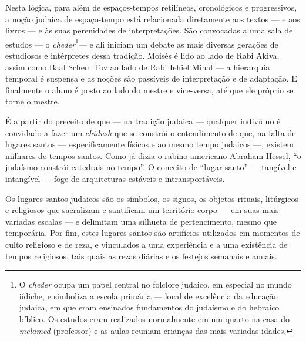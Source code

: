 Nesta lógica, para além de espaços-tempos retilíneos, cronológicos e
progressivos, a noção judaica de espaço-tempo está relacionada
diretamente aos textos --- e aos livros --- e às suas perenidades de
interpretações. São convocadas a uma sala de estudos --- o
\emph{cheder}\footnote{O \emph{cheder} ocupa um papel central no
  folclore judaico, em especial no mundo iídiche, e simboliza a
  escola primária --- local de excelência da educação judaica, em que
  eram ensinados fundamentos do judaísmo e do hebraico bíblico. Os
  estudos eram realizados normalmente em um quarto na casa do
  \emph{melamed} (professor) e as aulas reuniam crianças das mais
  variadas idades.}--- e ali iniciam um debate as mais diversas gerações
de estudiosos e intérpretes dessa tradição. Moisés é lido ao lado de
Rabi Akiva, assim como Baal Schem Tov ao lado de Rabi Iehiel Mihal --- a
hierarquia temporal é suspensa e as noções são passíveis de
interpretação e de adaptação. E finalmente o aluno é posto ao lado do
mestre e vice-versa, até que ele próprio se torne o mestre.

É a partir do preceito de que --- na tradição judaica --- qualquer
indivíduo é convidado a fazer um \emph{chidush} que se constrói o
entendimento de que, na falta de lugares santos --- especificamente
físicos e ao mesmo tempo judaicos ---, existem milhares de tempos
santos. Como já dizia o rabino americano Abraham Hessel, ``o judaísmo constrói catedrais no tempo''. O conceito de ``lugar
santo'' --- tangível e intangível --- foge de arquiteturas estáveis e
intransportáveis.

Os lugares santos judaicos são os símbolos, os signos, os objetos
rituais, litúrgicos e religiosos que sacralizam e santificam um
território-corpo --- em suas mais variadas escalas --- e delimitam uma
silhueta de pertencimento, mesmo que temporária. Por fim, estes lugares
santos são artifícios utilizados em momentos de culto religioso e de
reza, e vinculados a uma experiência e a uma existência de tempos
religiosos, tais quais as rezas diárias e os festejos semanais e anuais.

